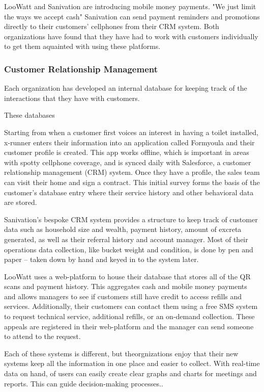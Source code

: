 \documentclass[sustainability,article,submit,moreauthors,pdftex,10pt,a4paper]{mdpi}
\theoremstyle{mdpi}
\newcounter{ex}
\newcounter{re}
\theoremstyle{mdpidefinition}
\begin{document}
LooWatt and Sanivation are introducing mobile money payments. 
"We just limit the ways we accept cash"
Sanivation can send payment reminders and promotions directly to their customers' cellphones from their CRM system.
 Both organizations have found that they have had to work with customers individually to get them aquainted with using these platforms. 


\subsubsection{Customer Relationship Management}
Each organization has developed an internal database for keeping track of the interactions that they have with customers. 

These databases 

Starting from when a customer first voices an interest in having a toilet installed, x-runner enters their information into an application called Formyoula and their customer profile is created. This app works offline, which is important in areas with spotty cellphone coverage, and is synced daily with Salesforce, a customer relationship management (CRM) system. Once they have a profile, the sales team can visit their home and sign a contract. This initial survey forms the basis of the customer’s database entry where their service history and other behavioral data are stored.%

Sanivation’s bespoke CRM system provides a structure to keep track of customer data such as household size and wealth, payment history, amount of excreta generated, as well as their referral history and account manager.  Most of their operations data collection, like bucket weight and condition, is done by pen and paper – taken down by hand and keyed in to the system later.%

LooWatt uses a web-platform to house their database that stores all of the QR scans and payment history.  This aggregates cash and mobile money payments and allows managers to see if customers still have credit to access refills and services. Additionally, their customers can contact them using a free SMS system to request technical service, additional refills, or an on-demand collection. These appeals are registered in their web-platform and the manager can send someone to attend to the request. %

Each of these systems is different, but theorgnizations enjoy that their  new systems keep all the information in one place and easier to collect. With real-time data on hand, of users can easily create clear graphs and charts for meetings and reports. This can  guide  decision-making processes.. %
\end{document}
